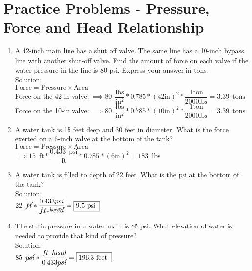 


\section*{Practice Problems - Pressure, Force and Head Relationship} 
\begin{enumerate}


\item A 42-inch main line has a shut off valve. The same line has a 10-inch bypass line with another shut-off valve. Find the amount of force on each valve if the water pressure in the line is 80 psi. Express your answer in tons.\\
\vspace{0.2cm}
Solution:\\
\vspace{0.2cm}
$\textrm{Force}= \textrm{Pressure} \times \textrm{Area}$\\
\vspace{0.3cm}
Force on the 42-in valve:
\vspace{0.3cm}
$\implies 80 \enspace \dfrac{\mathrm{lbs}}{\mathrm{in^2}}*0.785 *(42 \mathrm{in})^2*\dfrac{1 \mathrm{ton}}{2000 \mathrm{lbs}} =\boxed{3.39 \enspace\mathrm{tons}}$\\
\vspace{0.3cm}
Force on the 10-in valve:
\vspace{0.3cm}
$\implies 80 \enspace \dfrac{\mathrm{lbs}}{\mathrm{in^2}}*0.785 *(10 \mathrm{in})^2*\dfrac{1 \mathrm{ton}}{2000 \mathrm{lbs}} =\boxed{3.39 \enspace\mathrm{tons}}$
\vspace{0.2cm}
\item A water tank is 15 feet deep and 30 feet in diameter. What is the force exerted on a 6-inch valve at the bottom of the tank?\\
\vspace{0.5cm}
$\textrm{Force}= \textrm{Pressure} \times \textrm{Area}$\\
\vspace{0.5cm}
$\implies 15 \enspace\mathrm{ft}* \dfrac{0.433 \enspace \mathrm{psi}}{\mathrm{ft}}*0.785 *(6 \mathrm{in})^2 =\boxed{183 \enspace\mathrm{lbs}}$\\

\item A water tank is filled to depth of 22 feet. What is the psi at the bottom of the tank?\\
 \vspace{0.2cm}
Solution:\\ 
 \vspace{0.2cm}
$
22 \enspace \cancel{ft}*\dfrac{0.433psi}{\cancel{ft \enspace head}}=\boxed{9.5 \text { psi }}
$
  \vspace{0.2cm}
\item The static pressure in a water main is 85 psi. What elevation of water is needed to provide that kind of pressure?\\
 \vspace{0.2cm}
Solution:\\ 
 \vspace{0.2cm}
$
85 \enspace \cancel{psi}*\dfrac{ft \enspace head}{0.433\cancel{psi}}=\boxed{196.3 \text { feet }}
$
 

\end{enumerate}
